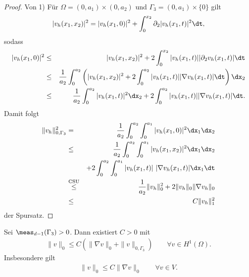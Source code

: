 \begin{proof}
    Von 1)
    Für $\Omega = (0, a_1) \times (0, a_2)$ und $\Gamma_3 = (0, a_1) \times
    \{0\}$ gilt
    \begin{eqnarray*}
          |v_h(x_1, x_2)|^2
        = |v_h(x_1, 0)|^2 + \int_0^{x_2} \partial_2 |v_h(x_1, t)|^2 \dt,
    \end{eqnarray*}
    sodass
    \begin{eqnarray*}
            |v_h(x_1, 0)|^2
        &\le& |v_h(x_1, x_2)|^2
              + 2 \int_0^{x_2} |v_h(x_1, t)| |\partial_2 v_h(x_1, t)| \dt \\
        &\le& \frac{1}{a_2} \int_0^{a_2} \left(|v_h(x_1, x_2)|^2
              + 2 \int_0^{a_2} |v_h(x_1, t)| |\nabla v_h(x_1, t)| \dt\right)
              \dx_2 \\
        &\le& \frac{1}{a_2} \int_0^{a_2} |v_h(x_1, t)|^2 \dx_2
              + 2 \int_0^{a_2} |v_h(x_1, t)| |\nabla v_h(x_1, t)| \dt.
    \end{eqnarray*}
    Damit folgt
    \begin{eqnarray*}
            \|v_h\|^2_{0,\Gamma_3}
        &=& \frac{1}{a_2} \int_0^{a_2} \int_0^{a_1} |v_h(x_1, 0)|^2 \dx_1
            \dx_2 \\
        &\le& \frac{1}{a_2} \int_0^{a_2} \int_0^{a_1} |v_h(x_1, x_2)|^2 \dx_1
              \dx_2 \\
              &&+ 2 \int_0^{a_2} \int_0^{a_1} |v_h(x_1, t)| \ |\nabla
              v_h(x_1, t)| \dx_1 \dt \\
        &\stackrel{\text{CSU}}{\le}& \frac{1}{a_2} \|v_h\|_0^2
              + 2 \|v_h\|_0 \|\nabla v_h\|_0 \\
        &\le& C \|v_h\|_1^2
    \end{eqnarray*}
    der Spursatz.
\end{proof}


\begin{Lemma}
    \label{lem:3.20}
    Sei $\meas_{d-1}(\Gamma_3) > 0$.  Dann existiert $C > 0$ mit
    \begin{eqnarray*}
        \|v\|_0 \le C (\|\nabla v\|_0 + \|v\|_{0,\Gamma_3})
        \qquad \forall v\in H^1(\Omega).
    \end{eqnarray*}
    Insbesondere gilt
    \begin{eqnarray*}
        \|v\|_0 \le C \|\nabla v\|_0 \qquad \forall v\in V.
    \end{eqnarray*}
\end{Lemma}


